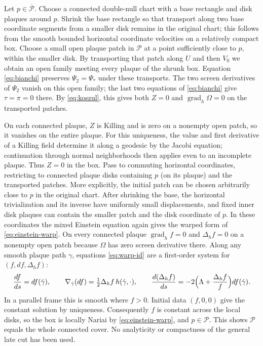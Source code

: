 \documentclass[11pt]{article}
\DeclareMathOperator{\grad}{grad}
\begin{document}
Let $p\in\overline{\mathcal P}$. Choose a connected double-null
chart with a base rectangle and disk plaques around $p$. Shrink
the base rectangle so that transport along two base coordinate
segments from a smaller disk remains in the original chart; this
follows from the smooth bounded horizontal coordinate velocities
on a relatively compact box. Choose a small open plaque patch
in $\mathcal P$ at a point sufficiently close to $p$, within the
smaller disk. By transporting that patch along $U$ and then $V_0$
we obtain an open family meeting every plaque of the shrunk box.
Equation \eqref{eq:bianchi} preserves $\Psi_2=\Psi_*$ under
these transports. The two screen derivatives of $\Psi_2$ vanish
on this open family; the last two equations of \eqref{eq:bianchi}
give $\tau=\pi=0$ there. By \eqref{eq:koszul}, this gives both
$Z=0$ and $\grad_h\Omega=0$ on the transported patches.

On each connected plaque, $Z$ is Killing and is zero on a nonempty
open patch, so it vanishes on the entire plaque. For this uniqueness,
the value and first derivative of a Killing field determine it
along a geodesic by the Jacobi equation; continuation through
normal neighborhoods then applies even to an incomplete plaque.
Thus $Z=0$ in the box. Pass to commuting horizontal coordinates,
restricting to connected plaque disks containing $p$ (on its
plaque) and the transported patches. More explicitly, the initial
patch can be chosen arbitrarily close to $p$ in the original chart.
After shrinking the base, the horizontal trivialization and its
inverse have uniformly small displacements, and fixed inner
disk plaques can contain the smaller patch and the disk coordinate
of $p$. In these coordinates the mixed Einstein equation again
gives the warped form of \eqref{eq:einstein-warp}. On every
connected plaque $\grad_h f=0$ and $\Delta_h f=0$ on a nonempty
open patch because $\Omega$ has zero screen derivative there.
Along any smooth plaque path $\gamma$, equations
\eqref{eq:warp-id} are a first-order system for
$(f,df,\Delta_h f)$:
\[
 \frac{df}{ds}=df(\dot\gamma),\qquad
 \nabla_{\dot\gamma}(df)=\tfrac12\Delta_h f\,h(\dot\gamma,\cdot),
 \qquad
 \frac{d(\Delta_h f)}{ds}
   =-2\Bigl(\Lambda+\frac{\Delta_h f}{f}\Bigr)df(\dot\gamma).
\]
In a parallel frame this is smooth where $f>0$. Initial data
$(f,0,0)$ give the constant solution by uniqueness. Consequently
$f$ is constant across the local disks, so the box is locally
Nariai by \eqref{eq:einstein-warp}, and $p\in\mathcal P$.
This shows $\mathcal P$ equals the whole connected cover. No
analyticity or compactness of the general late cut has been used.
\end{document}
